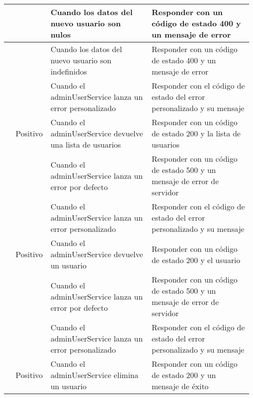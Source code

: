 \begin{small}
\begin{longtable}[H]{|>{\centering\arraybackslash}m{3cm}|>{\centering\arraybackslash}m{2cm}|>{\centering\arraybackslash}m{3cm}|>{\centering\arraybackslash}m{4cm}|}
		\cline{3-4}
		                                                 &                             & Cuando los datos del nuevo usuario son nulos                  & Responder con un código de estado 400 y un mensaje de error             \\
		\cline{3-4}
		                                                 &                             & Cuando los datos del nuevo usuario son indefinidos            & Responder con un código de estado 400 y un mensaje de error             \\
		\cline{3-4}
		                                                 &                             & Cuando el adminUserService lanza un error personalizado       & Responder con el código de estado del error personalizado y su mensaje  \\
		\hline
		\multirow{3}{4cm}{GET /list}                     & Positivo                    & Cuando el adminUserService devuelve una lista de usuarios     & Responder con un código de estado 200 y la lista de usuarios            \\
		\cline{2-4}
		                                                 & \multirow{2}{3cm}{Negativo} & Cuando el adminUserService lanza un error por defecto         & Responder con un código de estado 500 y un mensaje de error de servidor \\
		\cline{3-4}
		                                                 &                             & Cuando el adminUserService lanza un error personalizado       & Responder con el código de estado del error personalizado y su mensaje  \\
		\hline
		\multirow{3}{4cm}{GET /:id}                      & Positivo                    & Cuando el adminUserService devuelve un usuario                & Responder con un código de estado 200 y el usuario                      \\
		\cline{2-4}
		                                                 & \multirow{2}{3cm}{Negativo} & Cuando el adminUserService lanza un error por defecto         & Responder con un código de estado 500 y un mensaje de error de servidor \\
		\cline{3-4}
		                                                 &                             & Cuando el adminUserService lanza un error personalizado       & Responder con el código de estado del error personalizado y su mensaje  \\
		\hline
		\multirow{3}{4cm}{DELETE /:id}                   & Positivo                    & Cuando el adminUserService elimina un usuario                 & Responder con un código de estado 200 y un mensaje de éxito             \\

\end{longtable}
\end{small}
